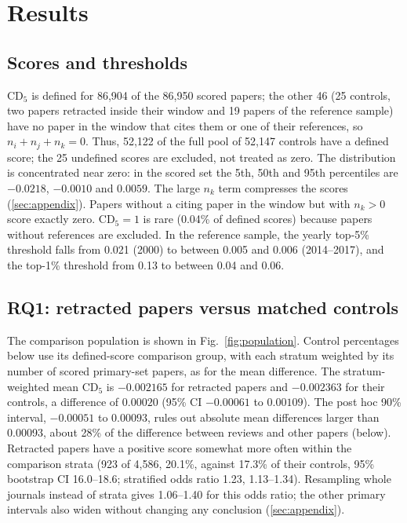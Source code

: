 \section{Results}\label{sec:results}

\subsection{Scores and thresholds}
CD$_5$ is defined for 86,904 of the 86,950 scored papers; the other 46 (25 controls, two papers retracted inside their
window and 19 papers of the reference sample) have no paper in the window that cites them or one of their references,
so $n_i+n_j+n_k=0$. Thus, 52,122 of the full pool of 52,147 controls have a defined score; the 25 undefined scores
are excluded, not treated as zero.
The distribution is concentrated near zero: in the scored set the 5th, 50th and 95th
percentiles are $-0.0218$, $-0.0010$ and $0.0059$. The large $n_k$ term compresses the scores
(\ref{sec:appendix}). Papers without a citing paper in the window but with $n_k>0$ score exactly zero. CD$_5 = 1$ is
rare (0.04\% of defined scores) because papers without references are excluded. In the reference sample, the yearly
top-5\% threshold falls from 0.021 (2000) to between 0.005 and 0.006 (2014--2017), and the top-1\% threshold from 0.13
to between 0.04 and 0.06.

\subsection{RQ1: retracted papers versus matched controls}
The comparison population is shown in Fig.~\ref{fig:population}. Control percentages below use its defined-score
comparison group, with each stratum weighted by its number of scored primary-set papers, as for the mean difference.
The stratum-weighted mean CD$_5$ is $-0.002165$ for retracted papers and $-0.002363$ for their controls, a difference of
$0.00020$ (95\% CI $-0.00061$ to $0.00109$).
The post hoc 90\% interval, $-0.00051$ to $0.00093$, rules out absolute
mean differences larger than 0.00093, about 28\% of the difference between reviews and other papers (below).
Retracted papers have a positive score somewhat
more often within the comparison strata (923 of 4,586, 20.1\%, against 17.3\% of their controls, 95\% bootstrap CI
16.0--18.6; stratified odds ratio 1.23, 1.13--1.34). Resampling whole journals instead of strata gives
1.06--1.40 for this odds ratio; the other primary intervals also widen without changing any conclusion
(\ref{sec:appendix}).

